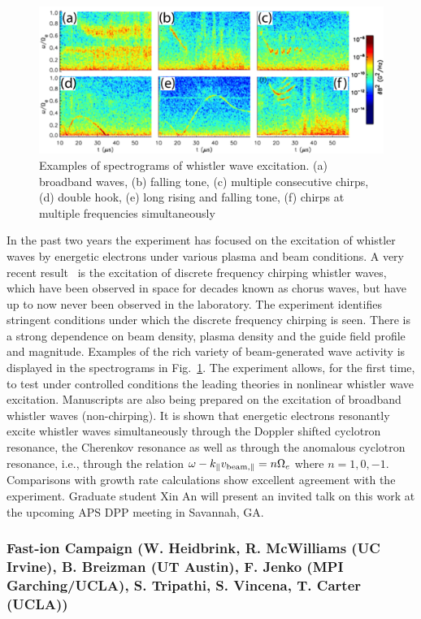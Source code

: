 \documentclass[11pt]{article}
\renewcommand{\cite}{\citep}
\begin{document}
\begin{figure}[!htbp]
\centerline{\includegraphics[width=5.6truein]{bortnik1a}}
\caption{Examples of spectrograms of whistler wave excitation. (a)
  broadband waves, (b) falling tone, (c) multiple consecutive chirps,
  (d) double hook, (e) long rising and falling tone, (f) chirps at
  multiple frequencies simultaneously}\label{bortnik1}
\end{figure}


In the past two years the experiment has focused on the excitation of
whistler waves by energetic electrons under various plasma and beam
conditions. A very recent result~\cite{vancompernolle:2015a} is the excitation
of discrete frequency chirping whistler waves, which have been observed
in space for decades known as chorus waves, but have up to now never
been observed in the laboratory. The experiment identifies stringent
conditions under which the discrete frequency chirping is seen. There is
a strong dependence on beam density, plasma density and the guide field
profile and magnitude. Examples of the rich variety of beam-generated
wave activity is displayed in the spectrograms in Fig.~\ref{bortnik1}. The
experiment allows, for the first time, to test under controlled
conditions the leading theories in nonlinear whistler wave excitation.
Manuscripts are also being prepared on the excitation of broadband
whistler waves (non-chirping). It is shown that energetic electrons
resonantly excite whistler waves simultaneously through the Doppler
shifted cyclotron resonance, the Cherenkov resonance as well as through
the anomalous cyclotron resonance, i.e., through the relation $\omega -
k_\parallel v_{{\rm beam}, \parallel} = n\Omega_{e}$ where
$n=1,0,-1$. Comparisons with
growth rate calculations show excellent agreement with the
experiment.  Graduate student Xin An will present an invited talk on
this work at the upcoming APS DPP meeting in Savannah, GA.

\subsubsection{Fast-ion Campaign (W. Heidbrink, R. McWilliams (UC Irvine), B.
Breizman (UT Austin), F. Jenko (MPI Garching/UCLA), S. Tripathi, S.
Vincena, T. Carter (UCLA))}
\end{document}
